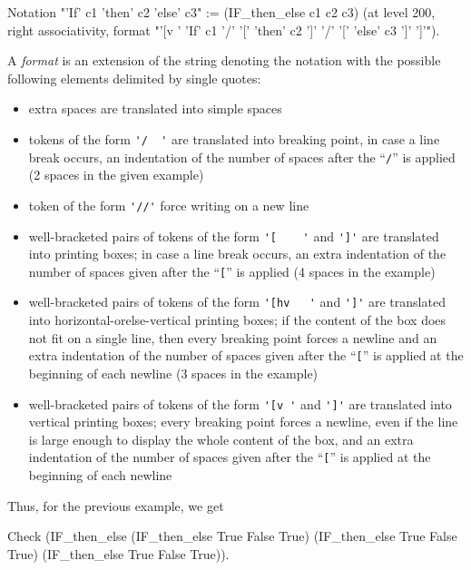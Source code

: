\begin{small}
\begin{coq_example}
Notation "'If' c1 'then' c2 'else' c3" := (IF_then_else c1 c2 c3)
 (at level 200, right associativity, format
  "'[v   ' 'If'  c1 '/' '[' 'then'  c2  ']' '/' '[' 'else'  c3 ']' ']'").
\end{coq_example}
\end{small}

A {\em format} is an extension of the string denoting the notation with
the possible following elements delimited by single quotes:

\begin{itemize}
\item extra spaces are translated into simple spaces
\item tokens of the form \verb='/  '= are translated into breaking point,
  in case a line break occurs, an indentation of the number of spaces
  after the ``\verb=/='' is applied (2 spaces in the given example)
\item token of the form \verb='//'= force writing on a new line
\item well-bracketed pairs of tokens of the form \verb='[    '= and \verb=']'=
  are translated into printing boxes; in case a line break occurs,
  an extra indentation of the number of spaces given after the ``\verb=[=''
  is applied (4 spaces in the example)
\item well-bracketed pairs of tokens of the form \verb='[hv   '= and \verb=']'=
  are translated into horizontal-orelse-vertical printing boxes; 
  if the content of the box does not fit on a single line, then every breaking
  point forces a newline and an extra  indentation of the number of spaces
  given after the ``\verb=[='' is applied at the beginning of each newline
  (3 spaces in the example)
\item well-bracketed pairs of tokens of the form \verb='[v '= and
  \verb=']'= are translated into vertical printing boxes; every
  breaking point forces a newline, even if the line is large enough to
  display the whole content of the box, and an extra indentation of the
  number of spaces given after the ``\verb=[='' is applied at the beginning
  of each newline
\end{itemize}

Thus, for the previous example, we get

\begin{coq_example}
Check 
 (IF_then_else (IF_then_else True False True) 
   (IF_then_else True False True)
   (IF_then_else True False True)).   
\end{coq_example}

